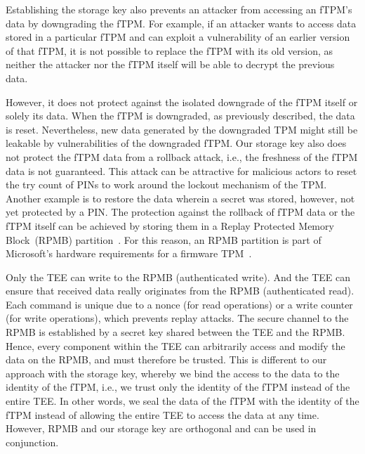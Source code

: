 Establishing the storage key also prevents an attacker from accessing an fTPM's data by downgrading the fTPM\@.
For example, if an attacker wants to access data stored in a particular fTPM and can exploit a vulnerability of an earlier version of that fTPM, it is not possible to replace the fTPM with its old version, as neither the attacker nor the fTPM itself will be able to decrypt the previous data.

However, it does not protect against the isolated downgrade of the fTPM itself or solely its data.
When the fTPM is downgraded, as previously described, the data is reset.
Nevertheless, new data generated by the downgraded TPM might still be leakable by vulnerabilities of the downgraded fTPM\@.
Our storage key also does not protect the fTPM data from a rollback attack, i.e., the freshness of the fTPM data is not guaranteed.
This attack can be attractive for malicious actors to reset the try count of PINs to work around the lockout mechanism of the TPM\@.
Another example is to restore the data wherein a secret was stored, however, not yet protected by a PIN\@.
The protection against the rollback of fTPM data or the fTPM itself can be achieved by storing them in a Replay Protected Memory Block~(RPMB) partition~\cite{eMMC, UFS}.
For this reason, an RPMB partition is part of Microsoft's hardware requirements for a firmware TPM~\cite{Raj2015}.

Only the TEE can write to the RPMB (authenticated write).
And the TEE can ensure that received data really originates from the RPMB (authenticated read).
Each command is unique due to a nonce (for read operations) or a write counter (for write operations), which prevents replay attacks.
The secure channel to the RPMB is established by a secret key shared between the TEE and the RPMB\@.
Hence, every component within the TEE can arbitrarily access and modify the data on the RPMB, and must therefore be trusted.
This is different to our approach with the storage key, whereby we bind the access to the data to the identity of the fTPM, i.e., we trust only the identity of the fTPM instead of the entire TEE\@.
In other words, we seal the data of the fTPM with the identity of the fTPM instead of allowing the entire TEE to access the data at any time.
However, RPMB and our storage key are orthogonal and can be used in conjunction.


